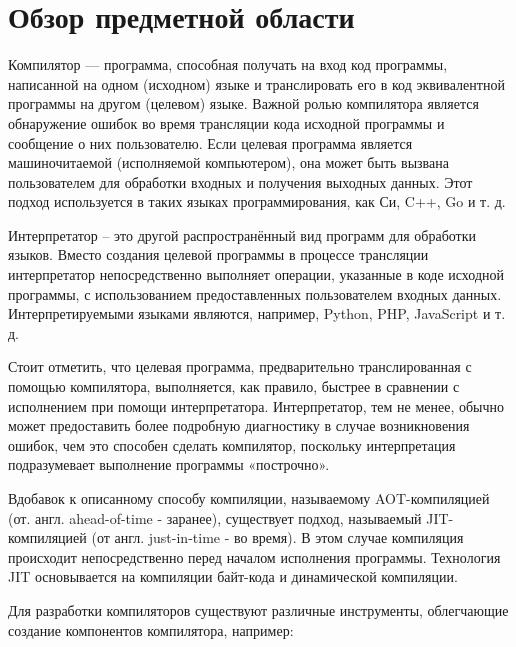 \newpage
\section{Обзор предметной области}
\label{sec:subject_overview}

Компилятор --- программа, способная получать на вход код программы, написанной на одном (исходном) языке и транслировать его в код эквивалентной программы на другом (целевом) языке.
Важной ролью компилятора является обнаружение ошибок во время трансляции кода исходной программы и сообщение о них пользователю.
Если целевая программа является машиночитаемой (исполняемой компьютером), она может быть вызвана пользователем для обработки входных и получения выходных данных.
Этот подход используется в таких языках программирования, как Си, C++, Go и т. д.

Интерпретатор -- это другой распространённый вид программ для обработки языков.
Вместо создания целевой программы в процессе трансляции интерпретатор непосредственно выполняет операции, указанные в коде исходной программы, с использованием предоставленных пользователем входных данных.
Интерпретируемыми языками являются, например, Python, PHP, JavaScript и т. д.

Стоит отметить, что целевая программа, предварительно транслированная с помощью компилятора, выполняется, как правило, быстрее в сравнении с исполнением при помощи интерпретатора.
Интерпретатор, тем не менее, обычно может предоставить более подробную диагностику в случае возникновения ошибок, чем это способен сделать компилятор, поскольку интерпретация подразумевает выполнение программы «построчно».

Вдобавок к описанному способу компиляции, называемому AOT-компиляцией (от. англ. ahead-of-time - заранее), существует подход, называемый JIT-компиляцией (от англ. just-in-time - во время).
В этом случае компиляция происходит непосредственно перед началом исполнения программы.
Технология JIT основывается на компиляции байт-кода и динамической компиляции.

Для разработки компиляторов существуют различные инструменты, облегчающие создание компонентов компилятора, например:


